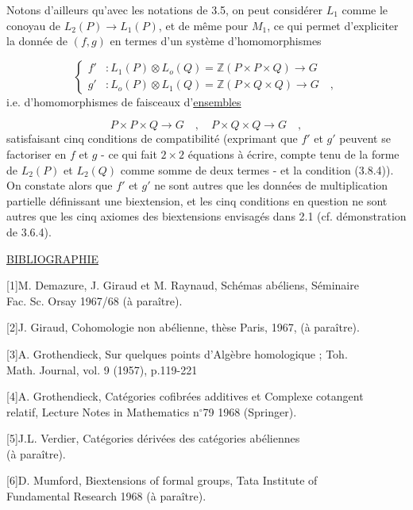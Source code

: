 Notons d'ailleurs qu'avec les notations de 3.5, on peut considérer $L_1$ comme le conoyau de $L_2(P) \longrightarrow L_1(P)$, et de même pour $M_1$, ce qui permet d'expliciter la donnée de $(f,g)$ en termes d'un système d'homomorphismes

\begin{equation*}
\left\{
\begin{aligned}
f' &: L_1(P) \otimes L_o(Q) = \mathbb{Z}(P\times P\times Q) \longrightarrow G\\
g' &: L_o(P) \otimes L_1(Q) = \mathbb{Z}(P\times Q\times Q) \longrightarrow G \quad ,
\end{aligned}
\right.
\end{equation*}
i.e. d'homomorphismes de faisceaux d'\underline{ensembles}

\begin{equation*}
P\times P\times Q \longrightarrow G \quad , \quad P\times Q\times Q \longrightarrow G \quad ,
\end{equation*}
satisfaisant cinq conditions de compatibilité (exprimant que $f'$ et $g'$ peuvent se factoriser en $f$ et $g$ - ce qui fait $2\times 2$ équations à écrire, compte tenu de la forme de $L_2(P)$ et $L_2(Q)$ comme somme de deux termes - et la condition (3.8.4)). On constate alors que $f'$ et $g'$ ne sont autres que les données de multiplication partielle définissant une biextension, et les cinq conditions en question ne sont autres que les cinq axiomes des biextensions envisagés dans 2.1 (cf. démonstration de 3.6.4).




\underline{BIBLIOGRAPHIE}

{[1]}\quad M. Demazure, J. Giraud et M. Raynaud, Schémas abéliens, Séminaire \\
\hspace*{4em}Fac. Sc. Orsay 1967/68 (à paraître).

{[2]}\quad J. Giraud, Cohomologie non abélienne, thèse Paris, 1967, (à paraître).

{[3]}\quad A. Grothendieck, Sur quelques points d'Algèbre homologique ; Toh. \\
\hspace*{4em}Math. Journal, vol. 9 (1957), p.119-221

{[4]}\quad A. Grothendieck, Catégories cofibrées additives et Complexe cotangent \\
\hspace*{4em}relatif, Lecture Notes in Mathematics n$^{\circ}$79 1968 (Springer).

{[5]}\quad J.L. Verdier, Catégories dérivées des catégories abéliennes \\
\hspace*{4em}(à paraître).

{[6]}\quad D. Mumford, Biextensions of formal groups, Tata Institute of \\
\hspace*{4em}Fundamental Research 1968 (à paraître).
